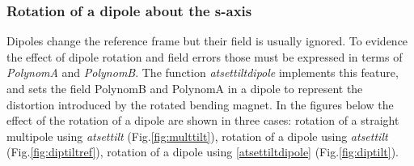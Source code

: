 \clearpage
\subsubsection*{Rotation of a dipole about the s-axis}

Dipoles change the reference frame but their field is usually ignored.
To evidence the effect of dipole rotation and field errors those must be expressed in terms of \emph{PolynomA} and \emph{PolynomB}. The function \emph{atsettiltdipole} implements this feature, and sets the field PolynomB and PolynomA in a dipole to represent the distortion introduced by the rotated bending magnet. In the figures below the effect of the rotation of a dipole are shown in three cases: rotation of a straight multipole using \emph{atsettilt} (Fig.\ref{fig:multtilt}), rotation of a dipole using \emph{atsettilt} (Fig.\ref{fig:diptiltref}), rotation of a dipole using \ref{atsettiltdipole} (Fig.\ref{fig:diptilt}).

